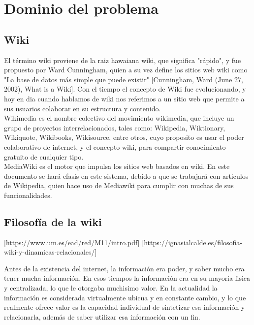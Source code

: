 





\section{Dominio del problema}
    \subsection{Wiki}

        El término wiki proviene de la raiz hawaiana wiki, que significa "rápido", y fue propuesto por Ward Cunningham, quien a su vez define los sitios web wiki como "La base de datos más simple que puede existir" [Cunningham, Ward (June 27, 2002), What is a Wiki]. Con el tiempo el concepto de Wiki fue evolucionando, y hoy en dia cuando hablamos de wiki nos referimos a un sitio web que permite a sus usuarios colaborar en su estructura y contenido.\\
        
        Wikimedia es el nombre colectivo del movimiento wikimedia, que incluye un grupo de proyectos interrelacionados, tales como: Wikipedia, Wiktionary, Wikiquote, Wikibooks, Wikisource, entre otros, cuyo proposito es usar el poder colaborativo de internet, y el concepto wiki, para compartir conocimiento gratuito de cualquier tipo.\\
        
        MediaWiki es el motor que impulsa los sitios web basados en wiki. En este documento se hará efasis en este sistema, debido a que se trabajará con articulos de Wikipedia, quien hace uso de Mediawiki para cumplir con muchas de sus funcionalidades.

    \subsection{Filosofía de la wiki}

        [https://www.um.es/ead/red/M11/intro.pdf]
        [https://ignasialcalde.es/filosofia-wiki-y-dinamicas-relacionales/]
        
        Antes de la existencia del internet, la información era poder, y saber mucho era tener mucha información. En esos tiempos la información era en su mayoria fisica y centralizada, lo que le otorgaba muchisimo valor. En la actualidad la información es considerada virtualmente ubicua y en constante cambio, y lo que realmente ofrece valor es la capacidad individual de sintetizar esa información y relacionarla, además de saber utilizar esa información con un fin.

